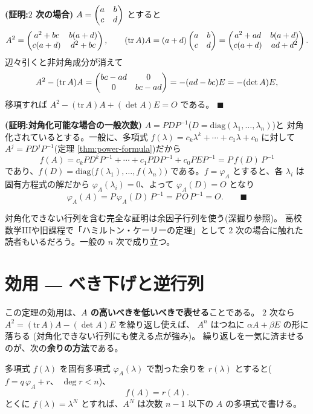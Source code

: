 \noindent\textbf{(証明:$2$ 次の場合)}\quad
$A = \begin{pmatrix}a & b \\ c & d\end{pmatrix}$ とすると
\[
A^2 = \begin{pmatrix}a^2 + bc & b(a + d) \\ c(a + d) & d^2 + bc\end{pmatrix}, \qquad
(\mathrm{tr}\,A)A = (a + d)\begin{pmatrix}a & b \\ c & d\end{pmatrix}
= \begin{pmatrix}a^2 + ad & b(a + d) \\ c(a + d) & ad + d^2\end{pmatrix}.
\]
辺々引くと非対角成分が消えて
\[
A^2 - (\mathrm{tr}\,A)A = \begin{pmatrix}bc - ad & 0 \\ 0 & bc - ad\end{pmatrix}
= -(ad - bc)E = -(\det A)E,
\]
移項すれば $A^2 - (\mathrm{tr}\,A)A + (\det A)E = O$ である。 $\blacksquare$

\noindent\textbf{(証明:対角化可能な場合の一般次数)}\quad
$A = PDP^{-1}$($D = \mathrm{diag}(\lambda_1, \dots, \lambda_n)$)と
対角化されているとする。一般に、多項式
$f(\lambda) = c_k\lambda^k + \cdots + c_1\lambda + c_0$ に対して
$A^j = PD^jP^{-1}$(定理 \ref{thm:power-formula})だから
\[
f(A) = c_k PD^kP^{-1} + \cdots + c_1 PDP^{-1} + c_0 PEP^{-1}
= P\,f(D)\,P^{-1}
\]
であり、$f(D) = \mathrm{diag}\bigl(f(\lambda_1), \dots, f(\lambda_n)\bigr)$
である。$f = \varphi_A$ とすると、各 $\lambda_i$ は固有方程式の解だから
$\varphi_A(\lambda_i) = 0$、よって $\varphi_A(D) = O$ となり
\[
\varphi_A(A) = P\,\varphi_A(D)\,P^{-1} = P\,O\,P^{-1} = O. \qquad\blacksquare
\]

対角化できない行列を含む完全な証明は余因子行列を使う(深掘り参照)。
高校数学IIIや旧課程で「ハミルトン・ケーリーの定理」として
$2$ 次の場合に触れた読者もいるだろう。一般の $n$ 次で成り立つ。

\section{効用 ― べき下げと逆行列}

この定理の効用は、\textbf{$A$ の高いべきを低いべきで表せる}ことである。
$2$ 次なら $A^2 = (\mathrm{tr}\,A)A - (\det A)E$ を繰り返し使えば、
$A^n$ はつねに $\alpha A + \beta E$ の形に落ちる
(対角化できない行列にも使える点が強み)。
繰り返しを一気に済ませるのが、次の\textbf{余りの方法}である。

\begin{teiri}[余りによるべき計算]\label{thm:ch-remainder}
多項式 $f(\lambda)$ を固有多項式 $\varphi_A(\lambda)$ で割った余りを
$r(\lambda)$ とすると($f = q\,\varphi_A + r$、
$\deg r < n$)、
\[
f(A) = r(A).
\]
とくに $f(\lambda) = \lambda^N$ とすれば、$A^N$ は次数 $n - 1$ 以下の
$A$ の多項式で書ける。
\end{teiri}

